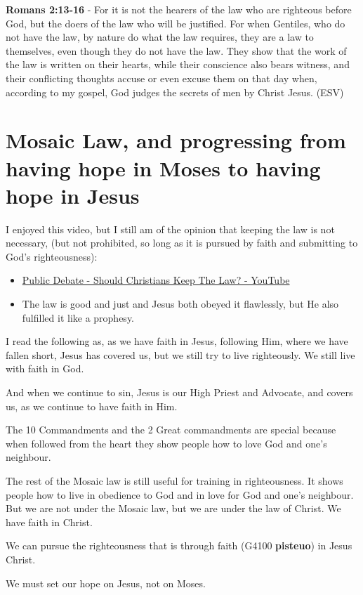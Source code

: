 \documentclass[11pt]{article}
\begin{document}
\textbf{Romans 2:13-16} - For it is not the hearers of the law who are righteous before God, but the doers of the law who will be justified.  For when Gentiles, who do not have the law, by nature do what the law requires, they are a law to themselves, even though they do not have the law.  They show that the work of the law is written on their hearts, while their conscience also bears witness, and their conflicting thoughts accuse or even excuse them on that day when, according to my gospel, God judges the secrets of men by Christ Jesus. (ESV)

\section{Mosaic Law, and progressing from having hope in Moses to having hope in Jesus}
\label{sec:org4641b80}
I enjoyed this video, but I still am of the opinion that keeping the law is not necessary, (but not prohibited, so long as it is pursued by faith and submitting to God's righteousness):
\begin{itemize}
\item \href{https://www.youtube.com/watch?v=CNHKqhwu6Bo}{Public Debate - Should Christians Keep The Law? - YouTube}
\item The law is good and just and Jesus both obeyed it flawlessly, but He also fulfilled it like a prophesy.
\end{itemize}

I read the following as, as we have faith in Jesus, following Him, where we have fallen short, Jesus has covered us, but we still try to live righteously. We still live with faith in God.

And when we continue to sin, Jesus is our High Priest and Advocate, and covers us, as we continue to have faith in Him.

The 10 Commandments and the 2 Great commandments are special because when followed from the heart they show people how to love God and one's neighbour.

The rest of the Mosaic law is still useful for training in righteousness. It shows people how to live in obedience to God and in love for God and one's neighbour. But we are not under the Mosaic law, but we are under the law of Christ. We have faith in Christ.

We can pursue the righteousness that is through faith (G4100 \textbf{pisteuo}) in Jesus Christ.

We must set our hope on Jesus, not on Moses.
\end{document}
